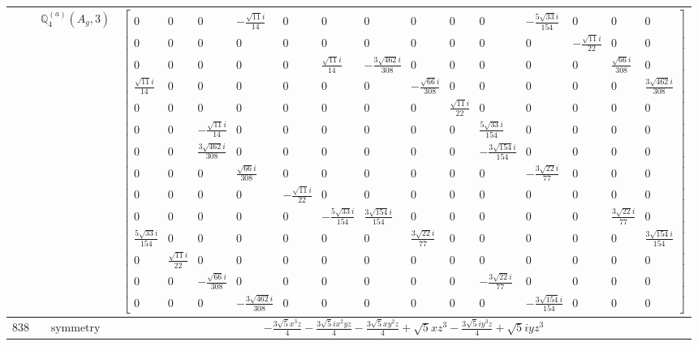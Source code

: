 \documentclass[fleqn,8pt,landscape]{jsarticle}
\begin{document}
\begin{longtable}{ccc}
$  $ & $ \mathbb{Q}_{4}^{(a)}(A_{g},3) $ & $ \begin{bmatrix} 0 & 0 & 0 & - \frac{\sqrt{11} i}{14} & 0 & 0 & 0 & 0 & 0 & 0 & - \frac{5 \sqrt{33} i}{154} & 0 & 0 & 0 \\ 0 & 0 & 0 & 0 & 0 & 0 & 0 & 0 & 0 & 0 & 0 & - \frac{\sqrt{11} i}{22} & 0 & 0 \\ 0 & 0 & 0 & 0 & 0 & \frac{\sqrt{11} i}{14} & - \frac{3 \sqrt{462} i}{308} & 0 & 0 & 0 & 0 & 0 & \frac{\sqrt{66} i}{308} & 0 \\ \frac{\sqrt{11} i}{14} & 0 & 0 & 0 & 0 & 0 & 0 & - \frac{\sqrt{66} i}{308} & 0 & 0 & 0 & 0 & 0 & \frac{3 \sqrt{462} i}{308} \\ 0 & 0 & 0 & 0 & 0 & 0 & 0 & 0 & \frac{\sqrt{11} i}{22} & 0 & 0 & 0 & 0 & 0 \\ 0 & 0 & - \frac{\sqrt{11} i}{14} & 0 & 0 & 0 & 0 & 0 & 0 & \frac{5 \sqrt{33} i}{154} & 0 & 0 & 0 & 0 \\ 0 & 0 & \frac{3 \sqrt{462} i}{308} & 0 & 0 & 0 & 0 & 0 & 0 & - \frac{3 \sqrt{154} i}{154} & 0 & 0 & 0 & 0 \\ 0 & 0 & 0 & \frac{\sqrt{66} i}{308} & 0 & 0 & 0 & 0 & 0 & 0 & - \frac{3 \sqrt{22} i}{77} & 0 & 0 & 0 \\ 0 & 0 & 0 & 0 & - \frac{\sqrt{11} i}{22} & 0 & 0 & 0 & 0 & 0 & 0 & 0 & 0 & 0 \\ 0 & 0 & 0 & 0 & 0 & - \frac{5 \sqrt{33} i}{154} & \frac{3 \sqrt{154} i}{154} & 0 & 0 & 0 & 0 & 0 & \frac{3 \sqrt{22} i}{77} & 0 \\ \frac{5 \sqrt{33} i}{154} & 0 & 0 & 0 & 0 & 0 & 0 & \frac{3 \sqrt{22} i}{77} & 0 & 0 & 0 & 0 & 0 & \frac{3 \sqrt{154} i}{154} \\ 0 & \frac{\sqrt{11} i}{22} & 0 & 0 & 0 & 0 & 0 & 0 & 0 & 0 & 0 & 0 & 0 & 0 \\ 0 & 0 & - \frac{\sqrt{66} i}{308} & 0 & 0 & 0 & 0 & 0 & 0 & - \frac{3 \sqrt{22} i}{77} & 0 & 0 & 0 & 0 \\ 0 & 0 & 0 & - \frac{3 \sqrt{462} i}{308} & 0 & 0 & 0 & 0 & 0 & 0 & - \frac{3 \sqrt{154} i}{154} & 0 & 0 & 0 \end{bmatrix} $ \\ \hline
$ 838 $ & $ \text{symmetry} $ & $ - \frac{3 \sqrt{5} x^{3} z}{4} - \frac{3 \sqrt{5} i x^{2} y z}{4} - \frac{3 \sqrt{5} x y^{2} z}{4} + \sqrt{5} x z^{3} - \frac{3 \sqrt{5} i y^{3} z}{4} + \sqrt{5} i y z^{3} $ \\

\end{longtable}
\end{document}
